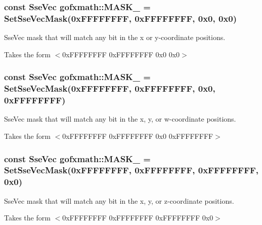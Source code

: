 \subsubsection[{M\+A\+S\+K\+\_\+1100}]{\setlength{\rightskip}{0pt plus 5cm}const {\bf Sse\+Vec} gofxmath\+::\+M\+A\+S\+K\+\_ = {\bf Set\+Sse\+Vec\+Mask}(0x\+F\+F\+F\+F\+F\+F\+F\+F, 0x\+F\+F\+F\+F\+F\+F\+F\+F, 0x0, 0x0)}\label{namespacegofxmath_aa909e3bfeab0b420da664a23efb26895}


Sse\+Vec mask that will match any bit in the x or y-\/coordinate positions. 

Takes the form $<$0x\+F\+F\+F\+F\+F\+F\+F\+F 0x\+F\+F\+F\+F\+F\+F\+F\+F 0x0 0x0$>$ \hypertarget{namespacegofxmath_af1a1ed503168492328267f3064cde68d}{}
\subsubsection[{M\+A\+S\+K\+\_\+1101}]{\setlength{\rightskip}{0pt plus 5cm}const {\bf Sse\+Vec} gofxmath\+::\+M\+A\+S\+K\+\_ = {\bf Set\+Sse\+Vec\+Mask}(0x\+F\+F\+F\+F\+F\+F\+F\+F, 0x\+F\+F\+F\+F\+F\+F\+F\+F, 0x0, 0x\+F\+F\+F\+F\+F\+F\+F\+F)}\label{namespacegofxmath_af1a1ed503168492328267f3064cde68d}


Sse\+Vec mask that will match any bit in the x, y, or w-\/coordinate positions. 

Takes the form $<$0x\+F\+F\+F\+F\+F\+F\+F\+F 0x\+F\+F\+F\+F\+F\+F\+F\+F 0x0 0x\+F\+F\+F\+F\+F\+F\+F\+F$>$ \hypertarget{namespacegofxmath_a557ea8335b7d1d30471f67b1853b74c6}{}
\subsubsection[{M\+A\+S\+K\+\_\+1110}]{\setlength{\rightskip}{0pt plus 5cm}const {\bf Sse\+Vec} gofxmath\+::\+M\+A\+S\+K\+\_ = {\bf Set\+Sse\+Vec\+Mask}(0x\+F\+F\+F\+F\+F\+F\+F\+F, 0x\+F\+F\+F\+F\+F\+F\+F\+F, 0x\+F\+F\+F\+F\+F\+F\+F\+F, 0x0)}\label{namespacegofxmath_a557ea8335b7d1d30471f67b1853b74c6}


Sse\+Vec mask that will match any bit in the x, y, or z-\/coordinate positions. 

Takes the form $<$0x\+F\+F\+F\+F\+F\+F\+F\+F 0x\+F\+F\+F\+F\+F\+F\+F\+F 0x\+F\+F\+F\+F\+F\+F\+F\+F 0x0$>$ 